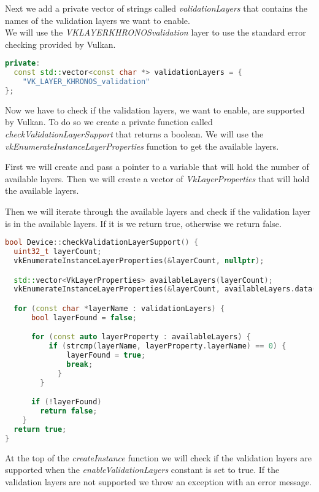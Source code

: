 \documentclass[12pt]{report} \usepackage{preamble}
\begin{document}
Next we add a private vector of strings called \textit{validationLayers} that contains the names of the
validation layers we want to enable. \\
We will use the \textit{VK\textunderscore LAYER\textunderscore KHRONOS\textunderscore validation}
layer to use the standard error checking provided by Vulkan.

\begin{lstlisting}[language=C++]
private:
  const std::vector<const char *> validationLayers = {
    "VK_LAYER_KHRONOS_validation"
};
\end{lstlisting}

Now we have to check if the validation layers, we want to enable, are supported by Vulkan.
To do so we create a private function called \textit{checkValidationLayerSupport} that returns a boolean.
We will use the \textit{vkEnumerateInstanceLayerProperties} function to get the available layers.

First we will create and pass a pointer to a variable that will hold the number of available layers.
Then we will create a vector of \textit{VkLayerProperties} that will hold the available layers.

Then we will iterate through the available layers and check if the validation layer is in the available layers.
If it is we return true, otherwise we return false.

\begin{lstlisting}[language=C++]
bool Device::checkValidationLayerSupport() {
  uint32_t layerCount;
  vkEnumerateInstanceLayerProperties(&layerCount, nullptr);

  std::vector<VkLayerProperties> availableLayers(layerCount);
  vkEnumerateInstanceLayerProperties(&layerCount, availableLayers.data());

  for (const char *layerName : validationLayers) {
      bool layerFound = false;

      for (const auto layerProperty : availableLayers) {
          if (strcmp(layerName, layerProperty.layerName) == 0) {
              layerFound = true;
              break;
            }
        }

      if (!layerFound)
        return false;
    }
  return true;
}
\end{lstlisting}

At the top of the \textit{createInstance} function we will check if the validation layers are supported
when the \textit{enableValidationLayers} constant is set to true. If the validation layers are not
supported we throw an exception with an error message.
\end{document}
